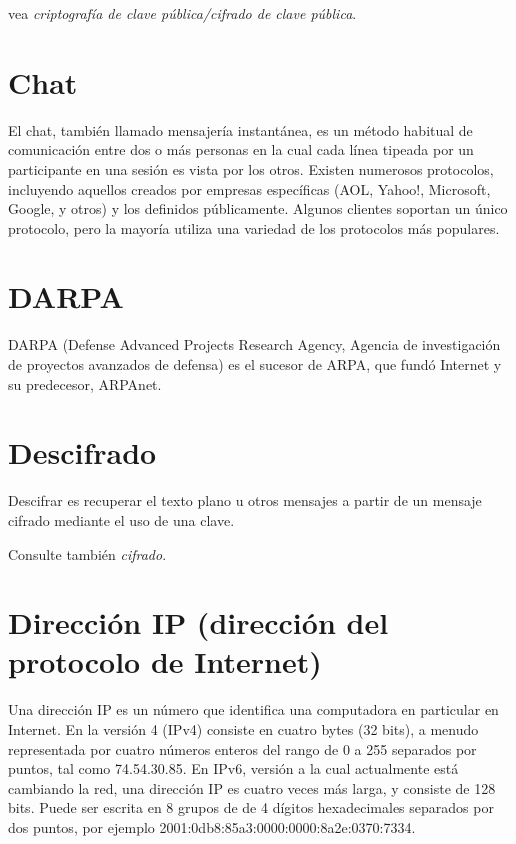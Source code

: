 \documentclass[10pt,a5paper,twoside,,]{book}
\begin{document}
vea \emph{criptografía de clave pública/cifrado de clave pública}.

\section{Chat}\label{chat}

El chat, también llamado mensajería instantánea, es un método habitual
de comunicación entre dos o más personas en la cual cada línea tipeada
por un participante en una sesión es vista por los otros. Existen
numerosos protocolos, incluyendo aquellos creados por empresas
específicas (AOL, Yahoo!, Microsoft, Google, y otros) y los definidos
públicamente. Algunos clientes soportan un único protocolo, pero la
mayoría utiliza una variedad de los protocolos más populares.

\section{DARPA}\label{darpa}

DARPA (Defense Advanced Projects Research Agency, Agencia de
investigación de proyectos avanzados de defensa) es el sucesor de ARPA,
que fundó Internet y su predecesor, ARPAnet.

\section{Descifrado}\label{descifrado}

Descifrar es recuperar el texto plano u otros mensajes a partir de un
mensaje cifrado mediante el uso de una clave.

Consulte también \emph{cifrado}.

\section{Dirección IP (dirección del protocolo de
Internet)}\label{direcciuxf3n-ip-direcciuxf3n-del-protocolo-de-internet}

Una dirección IP es un número que identifica una computadora en
particular en Internet. En la versión 4 (IPv4) consiste en cuatro bytes
(32 bits), a menudo representada por cuatro números enteros del rango de
0 a 255 separados por puntos, tal como 74.54.30.85. En IPv6, versión a
la cual actualmente está cambiando la red, una dirección IP es cuatro
veces más larga, y consiste de 128 bits. Puede ser escrita en 8 grupos
de de 4 dígitos hexadecimales separados por dos puntos, por ejemplo
2001:0db8:85a3:0000:0000:8a2e:0370:7334.
\end{document}
